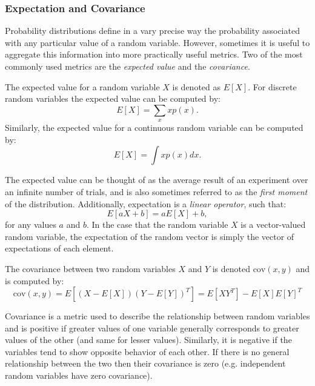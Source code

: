 \subsubsection{Expectation and Covariance}
Probability distributions define in a vary precise way the probability associated with any particular value of a random variable. However, sometimes it is useful to aggregate this information into more practically useful metrics. Two of the most commonly used metrics are the \textit{expected value} and the \textit{covariance}.
\begin{definition}
The expected value for a random variable $X$ is denoted as $E[X]$. For discrete random variables the expected value can be computed by:
\begin{equation*}
    E[X] = \sum_x x p(x).
\end{equation*}
Similarly, the expected value for a continuous random variable can be computed by:
\begin{equation*}
    E[X] = \int x p(x) dx.
\end{equation*}
\end{definition}
The expected value can be thought of as the average result of an experiment over an infinite number of trials, and is also sometimes referred to as the \textit{first moment} of the distribution.
Additionally, expectation is a \textit{linear operator}, such that:
\begin{equation*}
    E[aX + b]= aE[X] + b,
\end{equation*}
for any values $a$ and $b$.
In the case that the random variable $X$ is a vector-valued random variable, the expectation of the random vector is simply the vector of expectations of each element.

\begin{definition}[Covariance]
The covariance between two random variables $X$ and $Y$ is denoted $\text{cov}(x,y)$ and is computed by:
\begin{equation*}
    \text{cov}(x,y) = E[(X-E[X])(Y-E[Y])^T] = E[XY^T] - E[X]E[Y]^T
\end{equation*}
\end{definition}
Covariance is a metric used to describe the relationship between random variables and is positive if greater values of one variable generally corresponds to greater values of the other (and same for lesser values). Similarly, it is negative if the variables tend to show opposite behavior of each other. If there is no general relationship between the two then their covariance is zero (e.g. independent random variables have zero covariance).


